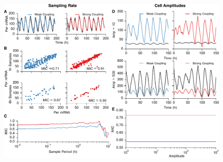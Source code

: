 \begin{figure}[p]
    \begin{center}
        \includegraphics[width=6.5in]{chap3/figures/s2.pdf}
    \end{center}
\end{figure}





